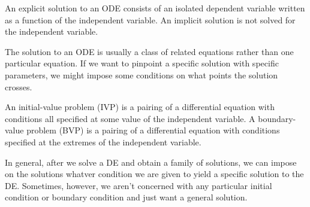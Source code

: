 \documentclass[../m82main.tex]{chapters}
\begin{document}
\begin{definition}
    An explicit solution to an ODE consists of an isolated dependent variable written as a function of the independent variable.
    An implicit solution is not solved for the independent variable.
\end{definition}

The solution to an ODE is usually a class of related equations rather than one particular equation.
If we want to pinpoint a specific solution with specific parameters, we might impose some conditions on what points the solution crosses.

\begin{definition}
    An initial-value problem (IVP) is a pairing of a differential equation with conditions all specified at some value of the independent variable.
    A boundary-value problem (BVP) is a pairing of a differential equation with conditions specified at the extremes of the independent variable.
\end{definition}

In general, after we solve a DE and obtain a family of solutions, we can impose on the solutions whatver condition we are given to yield a specific solution to the DE.
Sometimes, however, we aren't concerned with any particular initial condition or boundary condition and just want a general solution.
\end{document}

